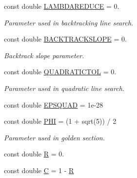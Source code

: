 {\bf }\par
\begin{DoxyCompactItemize}
\item 
const double \hyperlink{classCGMethod_a0fa651bde0efa2e195ec6a367a0e346e}{L\+A\+M\+B\+D\+A\+R\+E\+D\+U\+C\+E} = 0.
\begin{DoxyCompactList}\small\item\em Parameter used in backtracking line search. \end{DoxyCompactList}\item 
const double \hyperlink{classCGMethod_aa7a8cad90cb1961052e323ded645b4c2}{B\+A\+C\+K\+T\+R\+A\+C\+K\+S\+L\+O\+P\+E} = 0.
\begin{DoxyCompactList}\small\item\em Backtrack slope parameter. \end{DoxyCompactList}\end{DoxyCompactItemize}

{\bf }\par
\begin{DoxyCompactItemize}
\item 
const double \hyperlink{classCGMethod_acd9c51fe93f6d563f731dd2e30eb7922}{Q\+U\+A\+D\+R\+A\+T\+I\+C\+T\+O\+L} = 0.
\begin{DoxyCompactList}\small\item\em Parameter used in quadratic line search. \end{DoxyCompactList}\item 
const double \hyperlink{classCGMethod_adb2a688fe52a8729d703d81e52b9fdb3}{E\+P\+S\+Q\+U\+A\+D} = 1e-\/28
\end{DoxyCompactItemize}

{\bf }\par
\begin{DoxyCompactItemize}
\item 
const double \hyperlink{classCGMethod_ab6ca0706dec56fe6e35f15f9791b3e23}{P\+H\+I} = (1 + sqrt(5)) / 2
\begin{DoxyCompactList}\small\item\em Parameter used in golden section. \end{DoxyCompactList}\item 
const double \hyperlink{classCGMethod_a2e7906b4b29a1b76dca43d56eaf2efac}{R} = 0.
\item 
const double \hyperlink{classCGMethod_af8587ca1c0394c244ce84fe8a6ad29ff}{C} = 1 -\/ \hyperlink{classCGMethod_a2e7906b4b29a1b76dca43d56eaf2efac}{R}
\end{DoxyCompactItemize}



